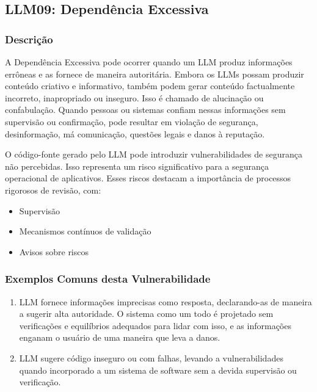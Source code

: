 \documentclass[
]{article}
\author{}
\date{}
\providecommand{\tightlist}{%
  \setlength{\itemsep}{0pt}\setlength{\parskip}{0pt}}
\begin{document}
\subsection{LLM09: Dependência
Excessiva}\label{llm09-dependuxeancia-excessiva}

\subsubsection{Descrição}\label{descriuxe7uxe3o}

A Dependência Excessiva pode ocorrer quando um LLM produz informações
errôneas e as fornece de maneira autoritária. Embora os LLMs possam
produzir conteúdo criativo e informativo, também podem gerar conteúdo
factualmente incorreto, inapropriado ou inseguro. Isso é chamado de
alucinação ou confabulação. Quando pessoas ou sistemas confiam nessas
informações sem supervisão ou confirmação, pode resultar em violação de
segurança, desinformação, má comunicação, questões legais e danos à
reputação.

O código-fonte gerado pelo LLM pode introduzir vulnerabilidades de
segurança não percebidas. Isso representa um risco significativo para a
segurança operacional de aplicativos. Esses riscos destacam a
importância de processos rigorosos de revisão, com:

\begin{itemize}
\tightlist
\item
  Supervisão
\item
  Mecanismos contínuos de validação
\item
  Avisos sobre riscos
\end{itemize}

\subsubsection{Exemplos Comuns desta
Vulnerabilidade}\label{exemplos-comuns-desta-vulnerabilidade}

\begin{enumerate}
\def\labelenumi{\arabic{enumi}.}
\tightlist
\item
  LLM fornece informações imprecisas como resposta, declarando-as de
  maneira a sugerir alta autoridade. O sistema como um todo é projetado
  sem verificações e equilíbrios adequados para lidar com isso, e as
  informações enganam o usuário de uma maneira que leva a danos.
\item
  LLM sugere código inseguro ou com falhas, levando a vulnerabilidades
  quando incorporado a um sistema de software sem a devida supervisão ou
  verificação.
\end{enumerate}
\end{document}

